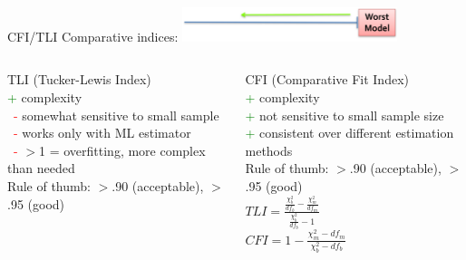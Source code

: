 \documentclass[10pt]{beamer}\usepackage[]{graphicx}\usepackage[]{xcolor}
\begin{document}
\begin{frame}{CFI/TLI}
Comparative indices:
\hfill
\hspace*{5cm}\includegraphics[height=1cm,keepaspectratio=T] {worst_fit.png}
\vspace*{1mm}

\begin{columns}[c]
TLI (Tucker-Lewis Index) \\
\textcolor{green}{+} complexity \\
\ \textcolor{red}{-} somewhat sensitive to small sample \\
\ \textcolor{red}{-} works only with ML estimator \\
\ \textcolor{red}{-} $>$1 = overfitting, more complex than needed \\
Rule of thumb: $>$.90 (acceptable), $>$.95 (good) \\
    
\vspace*{2mm}

CFI (Comparative Fit Index) \\
\textcolor{green}{+} complexity \\
\textcolor{green}{+} not sensitive to small sample size \\
\textcolor{green}{+} consistent over different estimation methods \\
Rule of thumb: $>$.90 (acceptable), $>$.95 (good) \\

$TLI = \frac{\frac{\chi_b^2}{df_b}-\frac{\chi_m^2}{df_m}}{\frac{\chi_b^2}{df_b}-1}$  \\
\vspace{15mm}
$CFI = 1-\frac{\chi_m^2-df_m}{\chi_b^2-df_b}$ \\
\end{columns}

\end{frame}
%
\end{document}
